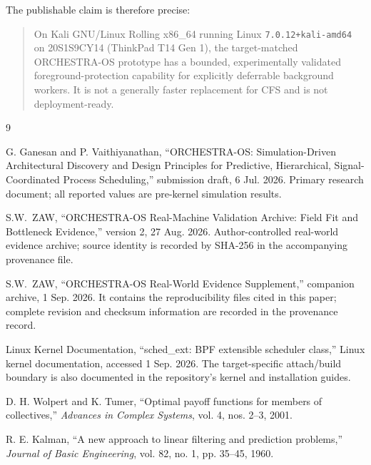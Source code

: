 \documentclass[10pt,letterpaper,twocolumn]{article}
\newcommand{\hostid}{20S1S9CY14 (ThinkPad T14 Gen 1)}
\newcommand{\AUTHOR}{S.W.\ ZAW}
\begin{document}
The publishable claim is therefore precise:

\begin{samepage}
\begin{quote}\small
On Kali GNU/Linux Rolling x86\_64 running Linux \texttt{7.0.12+kali-amd64} on \hostid, the target-matched ORCHESTRA-OS prototype has a bounded, experimentally validated foreground-protection capability for explicitly deferrable background workers. It is not a generally faster replacement for CFS and is not deployment-ready.
\end{quote}
\end{samepage}

\balance
\begin{thebibliography}{9}
\footnotesize

G. Ganesan and P. Vaithiyanathan, ``ORCHESTRA-OS: Simulation-Driven Architectural Discovery and Design Principles for Predictive, Hierarchical, Signal-Coordinated Process Scheduling,'' submission draft, 6 Jul. 2026. Primary research document; all reported values are pre-kernel simulation results.

\AUTHOR, ``ORCHESTRA-OS Real-Machine Validation Archive: Field Fit and Bottleneck Evidence,'' version 2, 27 Aug. 2026. Author-controlled real-world evidence archive; source identity is recorded by SHA-256 in the accompanying provenance file.

\AUTHOR, ``ORCHESTRA-OS Real-World Evidence Supplement,'' companion archive, 1 Sep. 2026. It contains the reproducibility files cited in this paper; complete revision and checksum information are recorded in the provenance record.

Linux Kernel Documentation, ``sched\_ext: BPF extensible scheduler class,'' Linux kernel documentation, accessed 1 Sep. 2026. The target-specific attach/build boundary is also documented in the repository's kernel and installation guides.

D. H. Wolpert and K. Tumer, ``Optimal payoff functions for members of collectives,'' \textit{Advances in Complex Systems}, vol. 4, nos. 2--3, 2001.

R. E. Kalman, ``A new approach to linear filtering and prediction problems,'' \textit{Journal of Basic Engineering}, vol. 82, no. 1, pp. 35--45, 1960.

\end{thebibliography}
\end{document}
